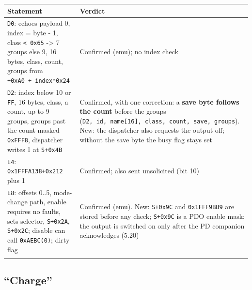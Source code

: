{\def\LTcaptype{none} %
\begin{longtable}[]{@{}
  >{\raggedright\arraybackslash}p{}
  >{\raggedright\arraybackslash}p{}@{}}
\toprule\noalign{}
\begin{minipage}[b]{\linewidth}\raggedright
Statement
\end{minipage} & \begin{minipage}[b]{\linewidth}\raggedright
Verdict
\end{minipage} \\
\midrule\noalign{}
\endhead
\bottomrule\noalign{}
\endlastfoot
\texttt{D0}: echoes payload 0, index = byte - 1, class
\texttt{\textless{}\ 0x65} -\textgreater{} 7 groups else 9, 16 bytes,
class, count, groups from \texttt{+0xA0\ +\ index*0x24} & Confirmed
(emu); no index check \\
\texttt{D2}: index below 10 or \texttt{FF}, 16 bytes, class, a count, up
to 9 groups, groups past the count masked \texttt{0xFFF8}, dispatcher
writes 1 at \texttt{S+0x4B} & Confirmed, with one correction: a
\textbf{save byte follows the count} before the groups
(\texttt{D2,\ id,\ name{[}16{]},\ class,\ count,\ save,\ groups}). New:
the dispatcher also requests the output off; without the save byte the
busy flag stays set \\
\texttt{E4}: \texttt{0x1FFFA138+0x212} plus 1 & Confirmed; also sent
unsolicited (bit 10) \\
\texttt{E8}: offsets 0..5, mode-change path, enable requires no faults,
sets selector, \texttt{S+0x2A}, \texttt{S+0x2C}; disable can call
\texttt{0xAEBC(0)}; dirty flag & Confirmed (emu). New: \texttt{S+0x9C}
and \texttt{0x1FFF9BB9} are stored before any check; \texttt{S+0x9C} is
a PDO enable mask; the output is switched on only after the PD companion
acknowledges (5.20) \\*
\end{longtable}
}

\subsection{``Charge''}\label{charge}

